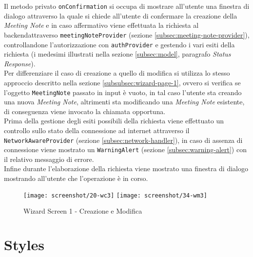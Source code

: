 Il metodo privato \lstinline{onConfirmation} si occupa di mostrare all'utente una finestra di dialogo attraverso la quale si chiede all'utente di confermare la creazione della \emph{Meeting Note} e in caso affermativo viene effettuata la richiesta al \gls{backend}\glsoccur attraverso \lstinline{meetingNoteProvider} (sezione \ref{subsec:meeting-note-provider}), controllandone l'autorizzazione con \lstinline{authProvider} e gestendo i vari esiti della richiesta (i medesimi illustrati nella sezione \ref{subsec:model},  paragrafo \emph{Status Response}). \\
Per differenziare il caso di creazione a quello di modifica si utilizza lo stesso approccio descritto nella sezione \ref{subsubsec:wizard-page-1}, ovvero si verifica se l'oggetto \lstinline{MeetingNote} passato in input è vuoto, in tal caso l'utente sta creando una nuova \emph{Meeting Note}, altrimenti sta modificando una \emph{Meeting Note} esistente, di conseguenza viene invocato la chiamata opportuna. \\
Prima della gestione degli esiti possibili della richiesta viene effettuato un controllo sullo stato della connessione ad internet attraverso il \lstinline{NetworkAwareProvider} (sezione \ref{subsec:network-handler}), in caso di assenza di connessione viene mostrato un \lstinline{WarningAlert} (sezione \ref{subsec:warning-alert}) con il relativo messaggio di errore. \\
Infine durante l'elaborazione della richiesta viene mostrato una finestra di dialogo mostrando all'utente che l'operazione è in corso.

\begin{figure}[!h] 
    \centering 
    \texttt{[image: screenshot/20-wc3]}
    \hfill
    \texttt{[image: screenshot/34-wm3]} 
    \caption{Wizard Screen 1 - Creazione e Modifica}
    \label{fig:w3}
\end{figure}

\newpage

\section{Styles}
\label{sec:styles}


